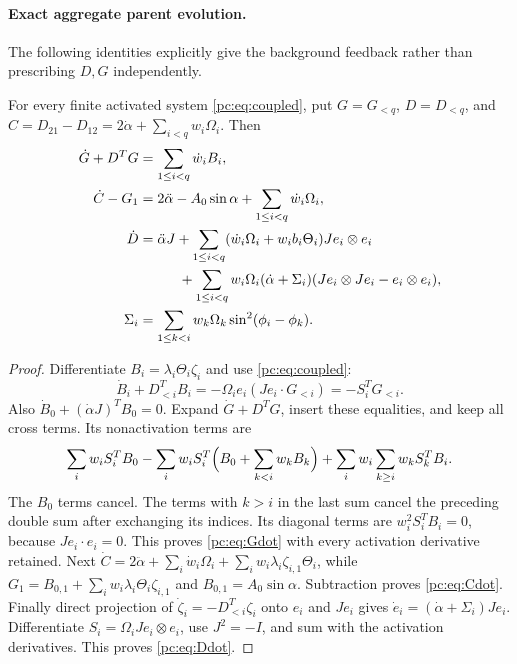 \paragraph{Exact aggregate parent evolution.}
The following identities explicitly give the background feedback rather than prescribing $D,G$ independently.
\begin{proposition}\label{pc:prop:aggregate}
For every finite activated system \eqref{pc:eq:coupled}, put $G=G_{<q}$, $D=D_{<q}$, and $C=D_{21}-D_{12}=2\dot\alpha+\sum_{i<q}w_i\Omega_i$. Then
\begin{align}
 \dot G+D^TG&=\sum_{1\le i<q}\dot w_i B_i,\label{pc:eq:Gdot}\\
 \dot C-G_1&=2\ddot\alpha-A_0\sin\alpha+\sum_{1\le i<q}\dot w_i\Omega_i,\label{pc:eq:Cdot}\\
 \dot D&=\ddot\alpha J+\sum_{1\le i<q}(\dot w_i\Omega_i+w_i b_i\Theta_i)Je_i\otimes e_i\nonumber\\
 &\hspace{10mm}+\sum_{1\le i<q}w_i\Omega_i(\dot\alpha+\Sigma_i)
 (Je_i\otimes Je_i-e_i\otimes e_i),\label{pc:eq:Ddot}\\
 \Sigma_i&=\sum_{1\le k<i}w_k\Omega_k\sin^2(\phi_i-\phi_k).\nonumber
\end{align}
\end{proposition}
\begin{proof}
Differentiate $B_i=\lambda_i\Theta_i\zeta_i$ and use \eqref{pc:eq:coupled}:
\[
 \dot B_i+D_{<i}^TB_i
 =-\Omega_i e_i(Je_i\cdot G_{<i})=-S_i^TG_{<i}.
\]
Also $\dot B_0+ (\dot\alpha J)^TB_0=0$. Expand $\dot G+D^TG$, insert these equalities, and keep all cross terms. Its nonactivation terms are
\[
 \sum_i w_i S_i^TB_0-
 \sum_iw_iS_i^T\Bigl(B_0+\sum_{k<i}w_kB_k\Bigr)
 +\sum_iw_i\sum_{k\ge i}w_kS_k^TB_i.
\]
The $B_0$ terms cancel. The terms with $k>i$ in the last sum cancel the preceding double sum after exchanging its indices. Its diagonal terms are $w_i^2S_i^TB_i=0$, because $Je_i\cdot e_i=0$. This proves \eqref{pc:eq:Gdot} with every activation derivative retained. Next $\dot C=2\ddot\alpha+\sum_i\dot w_i\Omega_i+\sum_iw_i\lambda_i\zeta_{i,1}\Theta_i$, while $G_1=B_{0,1}+\sum_iw_i\lambda_i\Theta_i\zeta_{i,1}$ and $B_{0,1}=A_0\sin\alpha$. Subtraction proves \eqref{pc:eq:Cdot}. Finally direct projection of $\dot\zeta_i=-D_{<i}^T\zeta_i$ onto $e_i$ and $Je_i$ gives $\dot e_i=(\dot\alpha+\Sigma_i)Je_i$. Differentiate $S_i=\Omega_iJe_i\otimes e_i$, use $J^2=-I$, and sum with the activation derivatives. This proves \eqref{pc:eq:Ddot}.
\end{proof}

